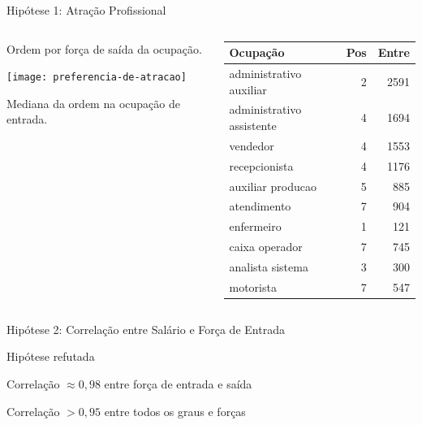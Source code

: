 \documentclass[10pt, hyperref={pdfpagelabels=false}]{beamer}
\begin{document}
\begin{frame}[c, label=hipotese-atracao]{Hipótese 1: Atração Profissional}
  \begin{center}
    \begin{columns}[T,onlytextwidth]
      \begin{column}{0.4\textwidth}
        Ordem por força de \alert{saída} da ocupação.
        
        \begin{center}
        \texttt{[image: preferencia-de-atracao]}
        \end{center}
         
        Mediana da ordem na ocupação de \alert{entrada}.
        
      \end{column}
      \begin{column}{0.6\textwidth}
        \centering
        \footnotesize
        \begin{table}[!h]
          \centering
          \begin{tabular}{l|r|r}
            \hline
            Ocupação & Pos & Entre\\
            \hline
            administrativo auxiliar & 2 & 2591\\
            \hline
            administrativo assistente & 4 & 1694\\
            \hline
            vendedor & 4 & 1553\\
            \hline
            recepcionista & 4 & 1176\\
            \hline
            auxiliar producao & 5 & 885\\
            \hline
            atendimento & 7 & 904\\
            \hline
            enfermeiro & 1 & 121\\
            \hline
            caixa operador & 7 & 745\\
            \hline
            analista sistema & 3 & 300\\
            \hline
            motorista & 7 & 547\\
            \hline
          \end{tabular}
        \end{table}
      \end{column}
    \end{columns}
  \end{center}
\end{frame}

\begin{frame}[c, label=hipotese-salario]{Hipótese 2: Correlação entre Salário e Força de Entrada}
  \begin{center}
    Hipótese \alert{refutada}
    
    Correlação $\approx 0,98$ entre força de entrada e saída
    
    Correlação $> 0,95$ entre todos os graus e forças
  \end{center}
\end{frame}
\end{document}
